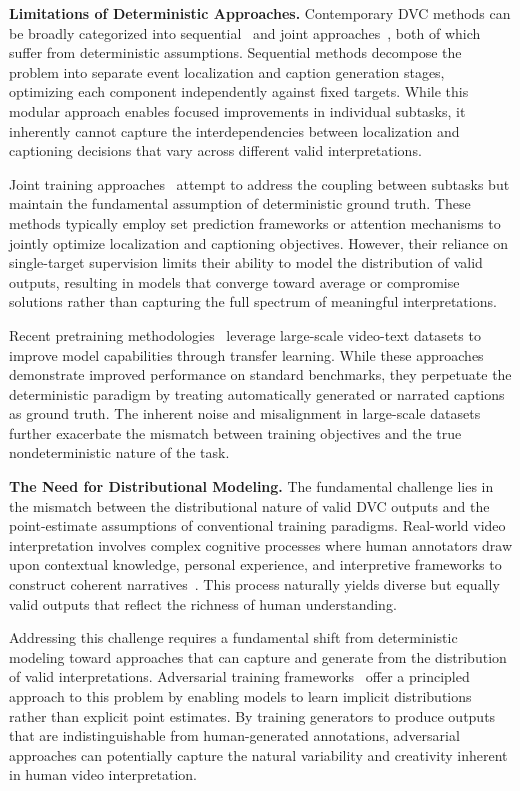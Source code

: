 \textbf{Limitations of Deterministic Approaches.}
Contemporary DVC methods can be broadly categorized into sequential~\cite{Krishna2017-pw,Li2018-ll} and joint approaches~\cite{Zhou2018-zu,Wang2021-zi,Deng2021-qd}, both of which suffer from deterministic assumptions. Sequential methods decompose the problem into separate event localization and caption generation stages, optimizing each component independently against fixed targets. While this modular approach enables focused improvements in individual subtasks, it inherently cannot capture the interdependencies between localization and captioning decisions that vary across different valid interpretations.

Joint training approaches~\cite{Wang2021-zi,Deng2021-qd} attempt to address the coupling between subtasks but maintain the fundamental assumption of deterministic ground truth. These methods typically employ set prediction frameworks or attention mechanisms to jointly optimize localization and captioning objectives. However, their reliance on single-target supervision limits their ability to model the distribution of valid outputs, resulting in models that converge toward average or compromise solutions rather than capturing the full spectrum of meaningful interpretations.

Recent pretraining methodologies~\cite{Zhang2022-ni,Yang2023-fm} leverage large-scale video-text datasets to improve model capabilities through transfer learning. While these approaches demonstrate improved performance on standard benchmarks, they perpetuate the deterministic paradigm by treating automatically generated or narrated captions as ground truth. The inherent noise and misalignment in large-scale datasets further exacerbate the mismatch between training objectives and the true nondeterministic nature of the task.

\textbf{The Need for Distributional Modeling.}
The fundamental challenge lies in the mismatch between the distributional nature of valid DVC outputs and the point-estimate assumptions of conventional training paradigms. Real-world video interpretation involves complex cognitive processes where human annotators draw upon contextual knowledge, personal experience, and interpretive frameworks to construct coherent narratives~\cite{radvansky2006event}. This process naturally yields diverse but equally valid outputs that reflect the richness of human understanding.

Addressing this challenge requires a fundamental shift from deterministic modeling toward approaches that can capture and generate from the distribution of valid interpretations. Adversarial training frameworks~\cite{Goodfellow2014-hs,Arjovsky2017-qu} offer a principled approach to this problem by enabling models to learn implicit distributions rather than explicit point estimates. By training generators to produce outputs that are indistinguishable from human-generated annotations, adversarial approaches can potentially capture the natural variability and creativity inherent in human video interpretation.

